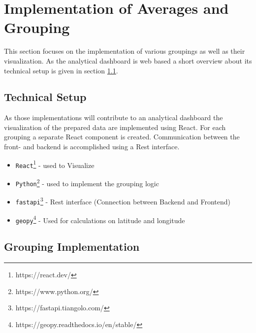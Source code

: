 %
%
% 
% 
% 

\chapter{Implementation of Averages and Grouping}
\label{chap:analytical_dashboard}
This section focuses on the implementation of various groupings as well as their visualization. As the analytical dashboard is web based a short overview about its technical setup is given in section \ref{sec:tech_set}.

\section{Technical Setup}
\label{sec:tech_set}
As those implementations will contribute to an analytical dashboard the visualization of the prepared data are implemented using React. For each grouping a separate React component is created. Communication between the front- and backend is accomplished using a Rest interface. 

\begin{itemize}
\item  \verb|React|\footnote{https://react.dev/} - used to Visualize
\item \verb|Python|\footnote{https://www.python.org/} - used to implement the grouping logic
\item \verb|fastapi|\footnote{https://fastapi.tiangolo.com/} - Rest interface (Connection between Backend and Frontend) 
\item \verb|geopy|\footnote{https://geopy.readthedocs.io/en/stable/} - Used for calculations on latitude and longitude 
\end{itemize}


\section{Grouping Implementation}

